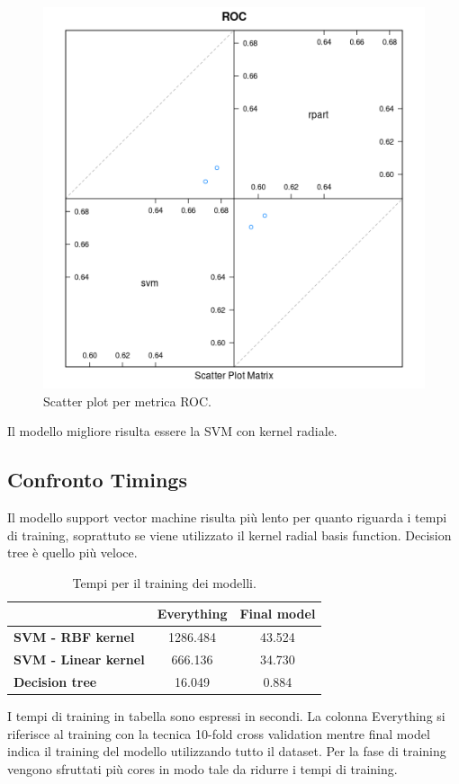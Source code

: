 \begin{figure}[H]
	\centering
	\includegraphics[width=13cm]{../images/compare_splom_plot.png}
	\caption{Scatter plot per metrica ROC.}
	\label{fig:compare_splom_plot}
\end{figure}

Il modello migliore risulta essere la SVM con kernel radiale.

\subsection{Confronto Timings} Il modello support vector machine
risulta più lento per quanto riguarda i tempi di training, soprattuto
se viene utilizzato il kernel radial basis function. Decision tree è
quello più veloce.

\begin{table}[H]
	\begin{center}
		\begin{tabular}{ | l | c | c |}
			\hline
			& \textbf{Everything} & \textbf{Final model} \\
			\hline
			\textbf{SVM - RBF kernel} & 1286.484  & 43.524 \\
			\textbf{SVM - Linear kernel} & 666.136 & 34.730 \\
			\textbf{Decision tree} & 16.049 & 0.884  \\
			\hline
		\end{tabular}
	\end{center}
	\caption{Tempi per il training dei modelli.}
\end{table}

I tempi di training in tabella sono espressi in secondi. La colonna
Everything si riferisce al training con la tecnica 10-fold cross
validation mentre final model indica il training del modello
utilizzando tutto il dataset. Per la fase di training vengono
sfruttati più cores in modo tale da ridurre i tempi di training.
